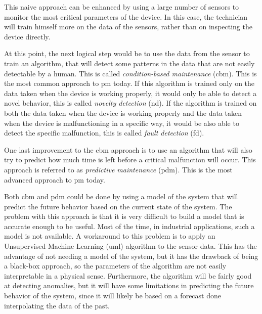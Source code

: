This naive approach can be enhanced by using a large number of sensors to monitor the most critical parameters of the device. In this case, the technician will train himself more on the data of the sensors, rather than on inspecting the device directly. 

At this point, the next logical step would be to use the data from the sensor to train an algorithm, that will detect some patterns in the data that are not easily detectable by a human. This is called \emph{condition-based maintenance} (\gls{cbm}). This is the most common approach to \gls{pm} today. If this algorithm is trained only on the data taken when the device is working properly, it would only be able to detect a novel behavior, this is called \emph{novelty detection} (\gls{nd}). If the algorithm is trained on both the data taken when the device is working properly and the data taken when the device is malfunctioning in a specific way, it would be also able to detect the specific malfunction, this is called \emph{fault detection} (\gls{fd}).

One last improvement to the \gls{cbm} approach is to use an algorithm that will also try to predict how much time is left before a critical malfunction will occur. This approach is referred to as \emph{predictive maintenance} (\gls{pdm}). This is the most advanced approach to \gls{pm} today.

Both \gls{cbm} and \gls{pdm} could be done by using a model of the system that will predict the future behavior based on the current state of the system. The problem with this approach is that it is very difficult to build a model that is accurate enough to be useful. Most of the time, in industrial applications, such a model is not available.
A workaround to this problem is to apply an Unsupervised Machine Learning (\gls{uml}) algorithm to the sensor data. This has the advantage of not needing a model of the system, but it has the drawback of being a black-box approach, so the parameters of the algorithm are not easily interpretable in a physical sense. Furthermore, the algorithm will be fairly good at detecting anomalies, but it will have some limitations in predicting the future behavior of the system, since it will likely be based on a forecast done interpolating the data of the past.

